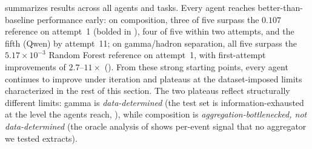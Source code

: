 \documentclass[universe,article,submit,pdftex,oneauthor]{Definitions/mdpi}
\begin{document}
 summarizes results across all agents and tasks. Every agent reaches better-than-baseline performance early: on composition, three of five surpass the $0.107$ reference on attempt~1 (bolded in ), four of five within two attempts, and the fifth (Qwen) by attempt~11; on gamma/hadron separation, all five surpass the $5.17 \times 10^{-3}$ Random Forest reference on attempt~1, with first-attempt improvements of $2.7$--$11\times$ (). From these strong starting points, every agent continues to improve under iteration and plateaus at the dataset-imposed limits characterized in the rest of this section. The two plateaus reflect structurally different limits: gamma is \emph{data-determined} (the test set is information-exhausted at the level the agents reach, ), while composition is \emph{aggregation-bottlenecked, not data-determined} (the oracle analysis of  shows per-event signal that no aggregator we tested extracts).
\end{document}
